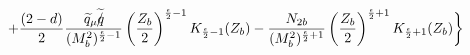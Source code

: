 \begin{equation}
+\frac{(2-d)}{2}\frac{\widetilde{q}_{\mu}\widetilde{q\hspace{-0.20cm}/}}{(M^{2}_{b})^{\frac{\epsilon}{2}-1}}
\left(\frac{Z_{b}}{2}\right)^{\frac{\epsilon}{2}-1}K_{\frac{\epsilon}{2}-1}(Z_{b})
-\frac{{N_{2b}}}{(M^{2}_{b})^{\frac{\epsilon}{2}+1}}
\left(\frac{Z_{b}}{2}\right)^{\frac{\epsilon}{2}+1}K_{\frac{\epsilon}{2}+1}(Z_{b})\biggr\}
\end{equation}


